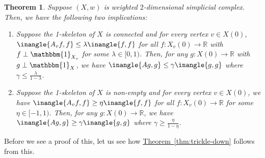 \documentclass[11pt]{article}
\newcommand{\expref}[2]{\texorpdfstring{\hyperref[#2]{#1~\ref{#2}}}{#1~\ref{#2}}}
\newtheorem{theorem}{Theorem}[section]
\newcommand{\R}{{\mathbb R}}
\begin{document}
\begin{theorem}\label{thm:trickle-down-one-level}
  Suppose $(X,w)$ is weighted $2$-dimensional simplicial complex. Then, we have the following two implications:
  \begin{enumerate}
  \item \label{thm:trickle-down-positive} Suppose the 1-skeleton of
    $X$ is connected and for every vertex $v \in X(0)$,
    $\inangle{A_v f,f} \leq \lambda \inangle{f,f}$ for all $f\colon
    X_v(0) \rightarrow \R$ with $f \perp \mathbbm{1}_{X_v}$ for some
    $\lambda \in [0,1)$. Then, for
    any $g\colon X(0) \rightarrow \R$ with $g \perp \mathbbm{1}_X$, we
have $\inangle{Ag,g} \leq \gamma \inangle{g,g}$ where $\gamma \leq
\frac{\lambda}{1- \lambda}$.
  \item \label{thm:trickle-down-negative} Suppose the 1-skeleton of
    $X$ is non-empty and for every vertex $v \in X(0)$, we have
    $\inangle{A_v f,f} \geq \eta \inangle{f,f}$ for all $f\colon
    X_v(0) \rightarrow \R$ for some $\eta \in [-1,1)$. Then, for any $g\colon X(0) \rightarrow \R$, we
have $\inangle{Ag,g} \geq \gamma \inangle{g,g}$ where $\gamma \geq
\frac{\eta}{1- \eta}$.
\end{enumerate}
  

\end{theorem}

\noindent Before we see a proof of this, let us  see how \expref{Theorem}{thm:trickle-down} follows from this.
\end{document}
